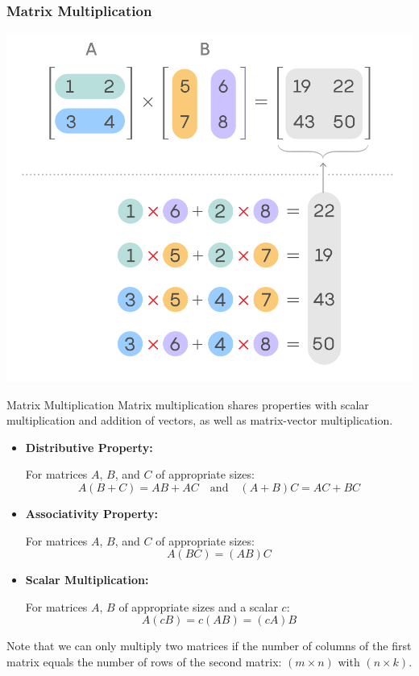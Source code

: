 \documentclass{beamer}
\begin{document}
\begin{frame}
  \frametitle{Matrix Multiplication}
  \begin{center}
    \includegraphics[height=0.9\textheight, keepaspectratio]{mmm.png}
  \end{center}
\end{frame}


\begin{frame}{Matrix Multiplication}
    Matrix multiplication shares properties with scalar multiplication and addition of vectors, as well as matrix-vector multiplication.
\begin{itemize}
    \item \textbf{Distributive Property:}

    For matrices \(A\), \(B\), and \(C\) of appropriate sizes:
    \[
      A(B + C) = AB + AC \quad \text{and} \quad (A + B)C = AC + BC
    \]

  \item \textbf{Associativity Property:}
  
    For matrices \(A\), \(B\), and \(C\) of appropriate sizes:
    \[
      A(BC) = (AB)C
    \]
  \item \textbf{Scalar Multiplication:}
  
    For matrices \(A\), \(B\) of appropriate sizes and a scalar \(c\):
    \[
      A(cB) = c(AB)=(cA)B
    \]
  \end{itemize}
\pause
    Note that we can only multiply two matrices if the number of columns of the first matrix equals the number of rows of the second matrix: $(m\times n)$ with $(n\times k)$.

\end{frame}
\end{document}
